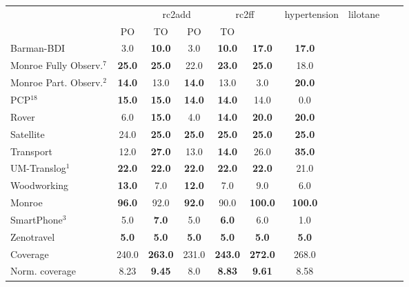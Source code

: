 \begin{tabular}{lccccccccccl} 
\toprule 
  && \multicolumn{2}{c}{rc2add} & \multicolumn{2}{c}{rc2ff} & \multicolumn{2}{c}{hypertension} & \multicolumn{2}{c}{lilotane} \\ 
\cmidrule(lr){3-4} \cmidrule(lr){5-6} \cmidrule(lr){7-8} \cmidrule(lr){9-10}  
 &PO & TO & PO & TO  \\ 
\midrule 
Barman-BDI & 3.0 & \textbf{10.0} & 3.0 & \textbf{10.0} & \textbf{17.0} & \textbf{17.0}  \\ 
Monroe Fully Observ.$^{7}$ & \textbf{25.0} & \textbf{25.0} & 22.0 & \textbf{23.0} & \textbf{25.0} & 18.0  \\ 
Monroe Part. Observ.$^{2}$ & \textbf{14.0} & 13.0 & \textbf{14.0} & 13.0 & 3.0 & \textbf{20.0}  \\ 
PCP$^{18}$ & \textbf{15.0} & \textbf{15.0} & \textbf{14.0} & \textbf{14.0} & 14.0 & 0.0  \\ 
Rover & 6.0 & \textbf{15.0} & 4.0 & \textbf{14.0} & \textbf{20.0} & \textbf{20.0}  \\ 
Satellite & 24.0 & \textbf{25.0} & \textbf{25.0} & \textbf{25.0} & \textbf{25.0} & \textbf{25.0}  \\ 
Transport & 12.0 & \textbf{27.0} & 13.0 & \textbf{14.0} & 26.0 & \textbf{35.0}  \\ 
UM-Translog$^{1}$ & \textbf{22.0} & \textbf{22.0} & \textbf{22.0} & \textbf{22.0} & \textbf{22.0} & 21.0  \\ 
Woodworking & \textbf{13.0} & 7.0 & \textbf{12.0} & 7.0 & 9.0 & 6.0  \\ 
\midrule 
 Monroe & \textbf{96.0} & 92.0 & \textbf{92.0} & 90.0 & \textbf{100.0} & \textbf{100.0}  \\ 
SmartPhone$^{3}$ & 5.0 & \textbf{7.0} & 5.0 & \textbf{6.0} & 6.0 & 1.0  \\ 
Zenotravel & \textbf{5.0} & \textbf{5.0} & \textbf{5.0} & \textbf{5.0} & \textbf{5.0} & \textbf{5.0}  \\ 
\midrule 
 Coverage & 240.0 & \textbf{263.0} & 231.0 & \textbf{243.0} & \textbf{272.0} & 268.0  \\ 
Norm. coverage & 8.23 & \textbf{9.45} & 8.0 & \textbf{8.83} & \textbf{9.61} & 8.58  \\ 
\bottomrule 
 \end{tabular} 
